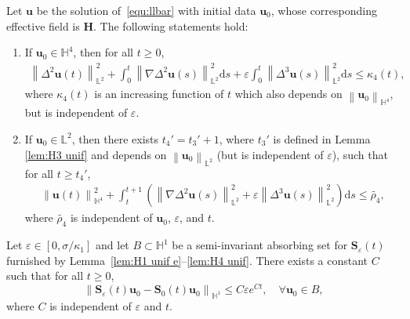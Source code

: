 \documentclass[10pt,a4paper]{amsart}
\newcommand{\bb}{\mathbb}
\newcommand{\bff}{\boldsymbol}
\newcommand{\ds}{\mathrm{d}s}
\newcommand{\norm}[2]{\left\|{#1}\right\|_{#2}}
\begin{document}
\begin{lemma}\label{lem:H4 unif}
Let $\bff{u}$ be the solution of~\eqref{equ:llbar} with initial data $\bff{u}_0$, whose corresponding effective field is $\bff{H}$. The following statements hold:
\begin{enumerate}
\item If $\bff{u}_0\in \bb{H}^4$, then for all $t\geq 0$,
\begin{align}\label{equ:et3 H4}
    \norm{\Delta^2 \bff{u}(t)}{\bb{L}^2}^2
    +
    \int_0^t \norm{\nabla \Delta^2 \bff{u}(s)}{\bb{L}^2}^2 \ds 
    +
    \varepsilon \int_0^t \norm{\Delta^3 \bff{u}(s)}{\bb{L}^2}^2 \ds 
    \leq
    \kappa_4(t),
\end{align}
where $\kappa_4(t)$ is an increasing function of $t$ which also depends on $\norm{\bff{u}_0}{\bb{H}^4}$, but is independent of $\varepsilon$.
\item If $\bff{u}_0\in\bb{L}^2$, then there exists $t_4'=t_3'+1$, where $t_3'$ is defined in Lemma \ref{lem:H3 unif} and depends on $\norm{\bff{u}_0}{\bb{L}^2}$ (but is independent of $\varepsilon$), such that for all $t\geq t_4'$,
\begin{align}\label{equ:tt1 H4}
    \norm{\bff{u}(t)}{\bb{H}^4}^2 
    +
    \int_t^{t+1} \left( \norm{\nabla \Delta^2 \bff{u}(s)}{\bb{L}^2}^2 + \varepsilon \norm{\Delta^3 \bff{u}(s)}{\bb{L}^2}^2 \right) \ds
    \leq
    \widetilde{\rho_4},
\end{align}
where $\widetilde{\rho_4}$ is independent of $\bff{u}_0$, $\varepsilon$, and $t$.
\end{enumerate}
\end{lemma}

\begin{lemma}\label{lem:Se S0 u0}
Let $\varepsilon\in [0, \sigma/\kappa_1]$ and let $B \subset \bb{H}^1$ be a semi-invariant absorbing set for $\bff{S}_\varepsilon(t)$ furnished by Lemma~\ref{lem:H1 unif e}--\ref{lem:H4 unif}. There exists a constant $C$ such that for all $t\geq 0$,
\begin{equation*}
    \norm{\bff{S}_\varepsilon(t) \bff{u}_0- \bff{S}_0(t) \bff{u}_0}{\bb{H}^1} \leq
    C\varepsilon e^{Ct},
    \quad \forall \bff{u}_0 \in B,
\end{equation*}
where $C$ is independent of $\varepsilon$ and $t$.
\end{lemma}
\end{document}
